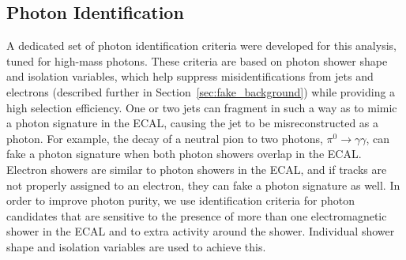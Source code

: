 \subsection{Photon Identification}

A dedicated set of photon identification criteria were developed for this analysis, tuned for high-mass photons. These criteria are based on photon shower shape and isolation variables, which help suppress misidentifications from jets and electrons (described further in Section~\ref{sec:fake_background}) while providing a high selection efficiency. One or two jets can fragment in such a way as to mimic a photon signature in the ECAL, causing the jet to be misreconstructed as a photon. For example, the decay of a neutral pion to two photons, $\pi^0 \to \gamma\gamma$, can fake a photon signature when both photon showers overlap in the ECAL. Electron showers are similar to photon showers in the ECAL, and if tracks are not properly assigned to an electron, they can fake a photon signature as well. In order to improve photon purity, we use identification criteria for photon candidates that are sensitive to the presence of more than one electromagnetic shower in the ECAL and to extra activity around the shower. Individual shower shape and isolation variables are used to achieve this.

